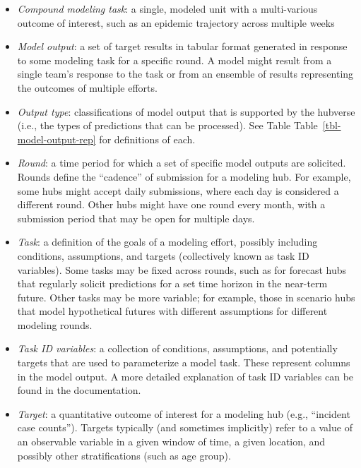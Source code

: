 \documentclass[
]{article}
\begin{document}
\begin{tcolorbox}
\begin{itemize}
\item
  \emph{Compound modeling task}: a single, modeled unit with a
  multi-various outcome of interest, such as an epidemic trajectory
  across multiple weeks
\item
  \emph{Model output}: a set of target results in tabular format
  generated in response to some modeling task for a specific round. A
  model might result from a single team's response to the task or from
  an ensemble of results representing the outcomes of multiple efforts.
\item
  \emph{Output type}: classifications of model output that is supported
  by the hubverse (i.e., the types of predictions that can be
  processed). See Table Table~\ref{tbl-model-output-rep} for definitions
  of each.
\item
  \emph{Round}: a time period for which a set of specific model outputs
  are solicited. Rounds define the ``cadence'' of submission for a
  modeling hub. For example, some hubs might accept daily submissions,
  where each day is considered a different round. Other hubs might have
  one round every month, with a submission period that may be open for
  multiple days.
\item
  \emph{Task}: a definition of the goals of a modeling effort, possibly
  including conditions, assumptions, and targets (collectively known as
  task ID variables). Some tasks may be fixed across rounds, such as for
  forecast hubs that regularly solicit predictions for a set time
  horizon in the near-term future. Other tasks may be more variable; for
  example, those in scenario hubs that model hypothetical futures with
  different assumptions for different modeling rounds.
\item
  \emph{Task ID variables}: a collection of conditions, assumptions, and
  potentially targets that are used to parameterize a model task. These
  represent columns in the model output. A more detailed explanation of
  task ID variables can be found in the documentation.
\item
  \emph{Target}: a quantitative outcome of interest for a modeling hub
  (e.g., ``incident case counts''). Targets typically (and sometimes
  implicitly) refer to a value of an observable variable in a given
  window of time, a given location, and possibly other stratifications
  (such as age group).
\end{itemize}

\end{tcolorbox}
\end{document}
